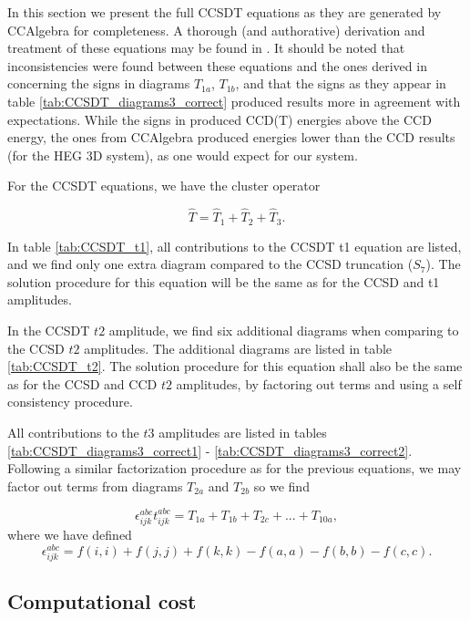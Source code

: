 In this section we present the full CCSDT equations as they are
generated by CCAlgebra for completeness. A thorough (and authorative)
derivation and treatment of these equations may be found in
\cite{ShavittBartlett2009}. It should be noted that inconsistencies
were found between these equations and the ones derived in
\cite{ShavittBartlett2009} concerning the signs in diagrams $T_{1a}$,
$T_{1b}$, and that the signs as they appear in table
\ref{tab:CCSDT_diagrams3_correct} produced results more in agreement
with expectations. While the signs in \cite{ShavittBartlett2009}
produced CCD(T) energies above the CCD energy, the ones from CCAlgebra
produced energies lower than the CCD results (for the HEG 3D system),
as one would expect for our system.

For the CCSDT equations, we have the cluster operator

\begin{equation}
\hat{T} = \hat{T}_1 + \hat{T}_2 + \hat{T}_3.
\end{equation}

In table \ref{tab:CCSDT_t1}, all contributions to the CCSDT t1 equation are listed, and we find only one extra diagram compared to the CCSD truncation ($S_7$). The solution procedure for this equation will be the same as for the CCSD and t1 amplitudes.

In the CCSDT $t2$ amplitude, we find six additional diagrams when
comparing to the CCSD $t2$ amplitudes. The additional diagrams are
listed in table \ref{tab:CCSDT_t2}. The solution procedure for this
equation shall also be the same as for the CCSD and CCD $t2$ amplitudes,
by factoring out terms and using a self consistency procedure.

All contributions to the $t3$ amplitudes are listed in tables
\ref{tab:CCSDT_diagrams3_correct1} -
\ref{tab:CCSDT_diagrams3_correct2}. Following a similar factorization
procedure as for the previous equations, we may factor out terms from
diagrams $T_{2a}$ and $T_{2b}$ so we find

\begin{equation}
\epsilon^{abc}_{ijk} t^{abc}_{ijk} = T_{1a} + T_{1b} + T_{2c} + ... + T_{10a},
\label{eqn:t3_factor}
\end{equation}
where we have defined
\begin{equation}
\epsilon^{abc}_{ijk} = f(i,i) + f(j,j) + f(k,k) - f(a,a) - f(b,b) - f(c,c).
\label{eqn:t3_factor}
\end{equation}

\subsection{Computational cost}

